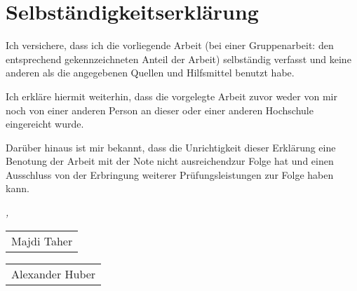 \chapter*{Selbständigkeitserklärung}

Ich versichere, dass ich die vorliegende Arbeit (bei einer Gruppenarbeit: den entsprechend gekennzeichneten
Anteil der Arbeit) selbständig verfasst und keine anderen als die angegebenen Quellen und
Hilfsmittel benutzt habe.

Ich erkläre hiermit weiterhin, dass die vorgelegte Arbeit zuvor weder von mir noch von einer anderen Person an dieser oder einer
anderen Hochschule eingereicht wurde.

Darüber hinaus ist mir bekannt, dass die Unrichtigkeit dieser Erklärung eine Benotung der 
Arbeit mit der Note \glqq nicht ausreichend\grqq zur Folge hat und einen Ausschluss von der Erbringung 
weiterer Prüfungsleistungen zur Folge haben kann.
\bigskip
 
\noindent\textit{\myLocation, \myTime}

\smallskip

\begin{flushright}
	\begin{tabular}{m{5cm}}
		\\ \hline
		\centering Majdi Taher \\
	\end{tabular}
\end{flushright}

\begin{flushright}
    \begin{tabular}{m{5cm}}
        \\ \hline
        \centering Alexander Huber \\
    \end{tabular}
\end{flushright}